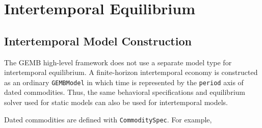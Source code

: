 \documentclass[
  letterpaper,
  DIV=11,
  numbers=noendperiod]{scrreprt}
\newenvironment{Shaded}{\begin{snugshade}}{\end{snugshade}}
\newcommand{\ConstantTok}[1]{\textcolor[rgb]{0.56,0.35,0.01}{#1}}
\newcommand{\ControlFlowTok}[1]{\textcolor[rgb]{0.00,0.23,0.31}{\textbf{#1}}}
\newcommand{\FunctionTok}[1]{\textcolor[rgb]{0.28,0.35,0.67}{#1}}
\newcommand{\KeywordTok}[1]{\textcolor[rgb]{0.00,0.23,0.31}{\textbf{#1}}}
\newcommand{\NormalTok}[1]{\textcolor[rgb]{0.00,0.23,0.31}{#1}}
\newcommand{\OperatorTok}[1]{\textcolor[rgb]{0.37,0.37,0.37}{#1}}
\newcommand{\SpecialCharTok}[1]{\textcolor[rgb]{0.37,0.37,0.37}{#1}}
\newcommand{\StringTok}[1]{\textcolor[rgb]{0.13,0.47,0.30}{#1}}
\begin{document}
%


\chapter{Intertemporal Equilibrium}\label{intertemporal-equilibrium}

\section{Intertemporal Model
Construction}\label{intertemporal-model-construction}

The GEMB high-level framework does not use a separate model type for
intertemporal equilibrium. A finite-horizon intertemporal economy is
constructed as an ordinary \texttt{GEMBModel} in which time is
represented by the \texttt{period} axis of dated commodities. Thus, the
same behavioral specifications and equilibrium solver used for static
models can also be used for intertemporal models.

Dated commodities are defined with \texttt{CommoditySpec}. For example,
\end{document}
